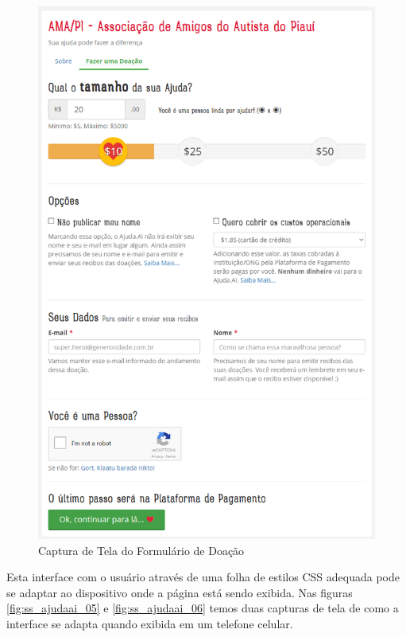 \begin{figure}[H]
	\caption{\label{fig:ss_ajudaai_04}Captura de Tela do Formulário de Doação}
    \centering
    \includegraphics[scale=0.6]{imagens/screenshot-ajudaai-04.png}
\end{figure}

Esta interface com o usuário através de uma folha de estilos CSS adequada pode se adaptar ao dispositivo onde a página está sendo exibida. Nas figuras \ref{fig:ss_ajudaai_05} e \ref{fig:ss_ajudaai_06} temos duas capturas de tela de como a interface se adapta quando exibida em um telefone celular.



